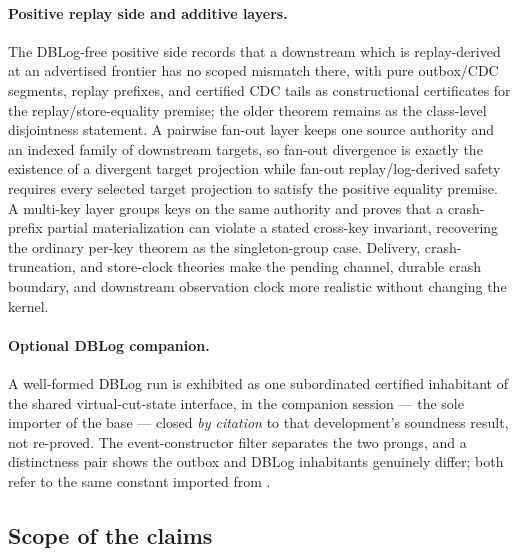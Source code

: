 \documentclass[11pt,a4paper]{article}
\begin{document}
\paragraph{Positive replay side and additive layers.} The DBLog-free positive
side records that a downstream which is replay-derived at an advertised frontier
has no scoped mismatch there, with pure outbox/CDC segments, replay prefixes, and
certified CDC tails as constructional certificates for the replay/store-equality
premise; the older
theorem remains as the class-level disjointness statement. A pairwise fan-out
layer keeps one source authority and an indexed family of downstream targets, so
fan-out divergence is exactly the existence of a divergent target projection
while fan-out replay/log-derived safety requires every selected target
projection to satisfy the positive equality premise. A multi-key layer groups
keys on the same authority and proves that a crash-prefix partial materialization
can violate a stated cross-key invariant, recovering the ordinary per-key theorem
as the singleton-group case. Delivery, crash-truncation, and store-clock theories
make the pending channel, durable crash boundary, and downstream observation
clock more realistic without changing the kernel.

\paragraph{Optional DBLog companion.} A well-formed DBLog run is exhibited as one
subordinated certified inhabitant of the shared virtual-cut-state interface, in
the companion session
--- the sole importer of the
 base --- closed
\emph{by citation} to that development's soundness result, not re-proved. The
event-constructor filter  separates the two
prongs, and a distinctness pair shows the outbox and DBLog inhabitants genuinely
differ; both refer to the same
 constant imported
from .

\subsection*{Scope of the claims}
\end{document}
